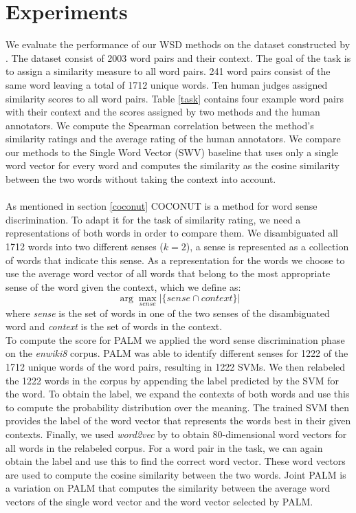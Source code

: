 \documentclass[11pt]{article}
\begin{document}
\section{Experiments}
We evaluate the performance of our WSD methods on the dataset constructed by \cite{global}. The dataset consist of 2003 word pairs and their context. The goal of the task is to assign a similarity measure to all word pairs. 241 word pairs consist of the same word leaving a total of 1712 unique words. Ten human judges assigned similarity scores to all word pairs. Table \ref{task} contains four example word pairs with their context and the scores assigned by two methods and the human annotators. We compute the Spearman correlation between the method's similarity ratings and the average rating of the human annotators. We compare our methods to the Single Word Vector (SWV) baseline that uses only a single word vector for every word and computes the similarity as the cosine similarity between the two words without taking the context into account. \\\\
As mentioned in section \ref{coconut} COCONUT is a method for word sense discrimination. To adapt it for the task of similarity rating, we need a representations of both words in order to compare them. We disambiguated all 1712 words into two different senses ($k = 2$), a sense is represented as a collection of words that indicate this sense. As a representation for the words we choose to use the average word vector of all words that belong to the most appropriate sense of the word given the context, which we define as:
\begin{equation}\label{sense} \arg\max_{\textit{sense}}  | \{\textit{sense} \cap \textit{context}\} |\end{equation}
where \textit{sense} is the set of words in one of the two senses of the disambiguated word and \textit{context} is the set of words in the context.\\


To compute the score for PALM we applied the word sense discrimination phase on the \textit{enwiki8} corpus. PALM was able to identify different senses for 1222 of the 1712 unique words of the word pairs, resulting in 1222 SVMs. We then relabeled the 1222 words in the corpus by appending the label predicted by the SVM for the word. To obtain the label, we expand the contexts of both words and use this to compute the probability distribution over the meaning. The trained SVM then provides the label of the word vector that represents the words best in their given contexts. Finally, we used \textit{word2vec} by \cite{word2vec} to obtain 80-dimensional word vectors for all words in the relabeled corpus. For a word pair in the task, we can again obtain the label and use this to find the correct word vector. These word vectors are used to compute the cosine similarity between the two words. Joint PALM is a variation on PALM that computes the similarity between the average word vectors of the single word vector and the word vector selected by PALM.
\end{document}
